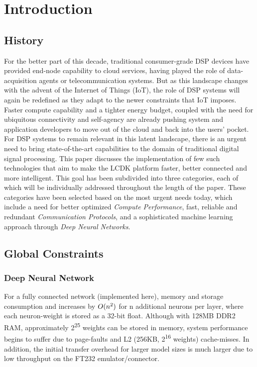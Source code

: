 
\section{Introduction}

\subsection{History}
For the better part of this decade, traditional consumer-grade DSP devices have provided end-node capability to cloud services, having played the role of data-acquisition agents or telecommunication systems. But as this landscape changes with the advent of the Internet of Things (IoT), the role of DSP systems will again be redefined as they adapt to the newer constraints that IoT imposes. Faster compute capability and a tighter energy budget, coupled with the need for ubiquitous connectivity and self-agency are already pushing\cite{lite} system and application developers to move out of the cloud and back into the users' pocket. For DSP systems to remain relevant in this latent landscape, there is an urgent need to bring state-of-the-art capabilities to the domain of traditional digital signal processing. This paper discusses the implementation of few such technologies that aim to make the LCDK platform faster, better connected and more intelligent. This goal has been subdivided into three categories, each of which will be individually addressed throughout the length of the paper. These categories have been selected based on the most urgent needs today, which include a need for better optimized \emph{Compute Performance}, fast, reliable and redundant \emph{Communication Protocols}, and a sophisticated machine learning approach through \emph{Deep Neural Networks}. 



\subsection{Global Constraints}
\subsubsection{Deep Neural Network}
For a fully connected network (implemented here), memory and storage consumption and increases by $O(n\textsuperscript{2})$ for n additional neurons per layer, where each neuron-weight is stored as a 32-bit float. Although with 128MB DDR2 RAM, approximately 2\textsuperscript{25} weights can be stored in memory, system performance begins to suffer due to page-faults and L2 (256KB, 2\textsuperscript{16} weights) cache-misses. In addition, the initial transfer overhead for larger model sizes is much larger due to low throughput on the FT232 emulator/connector.\\

